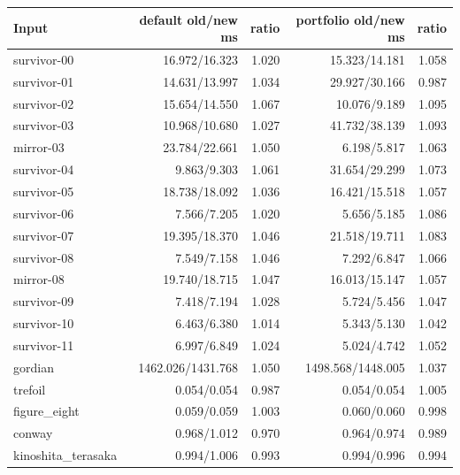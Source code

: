 \begin{center}\small
\begin{tabular}{@{}lrrrr@{}}
\toprule
Input & default old/new ms & ratio & portfolio old/new ms & ratio \\
\midrule
survivor-00 & 16.972/16.323 & 1.020 & 15.323/14.181 & 1.058 \\
survivor-01 & 14.631/13.997 & 1.034 & 29.927/30.166 & 0.987 \\
survivor-02 & 15.654/14.550 & 1.067 & 10.076/9.189 & 1.095 \\
survivor-03 & 10.968/10.680 & 1.027 & 41.732/38.139 & 1.093 \\
mirror-03 & 23.784/22.661 & 1.050 & 6.198/5.817 & 1.063 \\
survivor-04 & 9.863/9.303 & 1.061 & 31.654/29.299 & 1.073 \\
survivor-05 & 18.738/18.092 & 1.036 & 16.421/15.518 & 1.057 \\
survivor-06 & 7.566/7.205 & 1.020 & 5.656/5.185 & 1.086 \\
survivor-07 & 19.395/18.370 & 1.046 & 21.518/19.711 & 1.083 \\
survivor-08 & 7.549/7.158 & 1.046 & 7.292/6.847 & 1.066 \\
mirror-08 & 19.740/18.715 & 1.047 & 16.013/15.147 & 1.057 \\
survivor-09 & 7.418/7.194 & 1.028 & 5.724/5.456 & 1.047 \\
survivor-10 & 6.463/6.380 & 1.014 & 5.343/5.130 & 1.042 \\
survivor-11 & 6.997/6.849 & 1.024 & 5.024/4.742 & 1.052 \\
gordian & 1462.026/1431.768 & 1.050 & 1498.568/1448.005 & 1.037 \\
trefoil & 0.054/0.054 & 0.987 & 0.054/0.054 & 1.005 \\
figure\_eight & 0.059/0.059 & 1.003 & 0.060/0.060 & 0.998 \\
conway & 0.968/1.012 & 0.970 & 0.964/0.974 & 0.989 \\
kinoshita\_terasaka & 0.994/1.006 & 0.993 & 0.994/0.996 & 0.994 \\
\bottomrule
\end{tabular}
\end{center}
